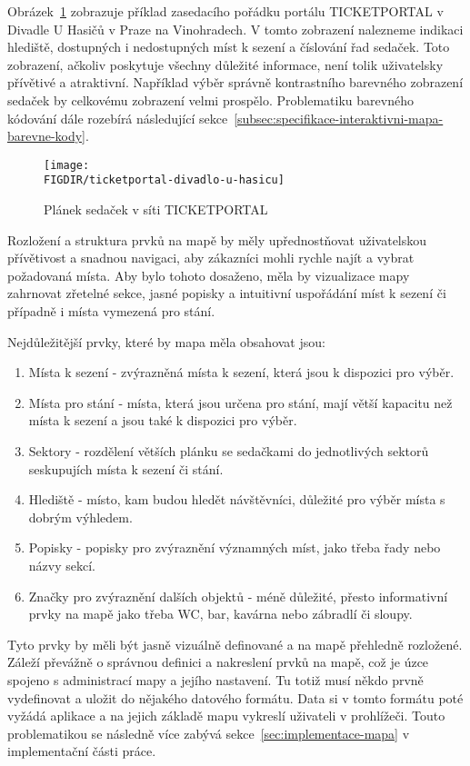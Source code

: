 Obrázek~\ref{fig:venue-map-visualization-layout-and-structure} zobrazuje příklad zasedacího pořádku portálu TICKETPORTAL v Divadle U Hasičů v Praze na Vinohradech.
V tomto zobrazení nalezneme indikaci hlediště, dostupných i nedostupných míst k sezení a číslování řad sedaček.
Toto zobrazení, ačkoliv poskytuje všechny důležité informace, není tolik uživatelsky přívětivé a atraktivní.
Například výběr správně kontrastního barevného zobrazení sedaček by celkovému zobrazení velmi prospělo.
Problematiku barevného kódování dále rozebírá následující sekce~\ref{subsec:specifikace-interaktivni-mapa-barevne-kody}.

\begin{figure}[H]
    \texttt{[image: \\FIGDIR/ticketportal-divadlo-u-hasicu]}
    \centering
    \caption{Plánek sedaček v síti TICKETPORTAL}
    \label{fig:venue-map-visualization-layout-and-structure}
\end{figure}

Rozložení a struktura prvků na mapě by měly upřednostňovat uživatelskou přívětivost a snadnou navigaci, aby zákazníci mohli rychle najít a vybrat požadovaná místa.
Aby bylo tohoto dosaženo, měla by vizualizace mapy zahrnovat zřetelné sekce, jasné popisky a intuitivní uspořádání míst k sezení či případně i místa vymezená pro stání.

Nejdůležitější prvky, které by mapa měla obsahovat jsou:
\begin{enumerate}
    \item Místa k sezení - zvýrazněná místa k sezení, která jsou k dispozici pro výběr.
    \item Místa pro stání - místa, která jsou určena pro stání, mají větší kapacitu než místa k sezení a jsou také k dispozici pro výběr.
    \item Sektory - rozdělení větších plánku se sedačkami do jednotlivých sektorů seskupujích místa k sezení či stání.
    \item Hlediště - místo, kam budou hledět návštěvníci, důležité pro výběr místa s dobrým výhledem.
    \item Popisky - popisky pro zvýraznění významných míst, jako třeba řady nebo názvy sekcí.
    \item Značky pro zvýraznění dalších objektů - méně důležité, přesto informativní prvky na mapě jako třeba WC, bar, kavárna nebo zábradlí či sloupy.
\end{enumerate}

Tyto prvky by měli být jasně vizuálně definované a na mapě přehledně rozložené.
Záleží převážně o správnou definici a nakreslení prvků na mapě, což je úzce spojeno s administrací mapy a jejího nastavení.
Tu totiž musí někdo prvně vydefinovat a uložit do nějakého datového formátu.
Data si v tomto formátu poté vyžádá aplikace a na jejich základě mapu vykreslí uživateli v prohlížeči.
Touto problematikou se následně více zabývá sekce~\ref{sec:implementace-mapa} v implementační části práce.

